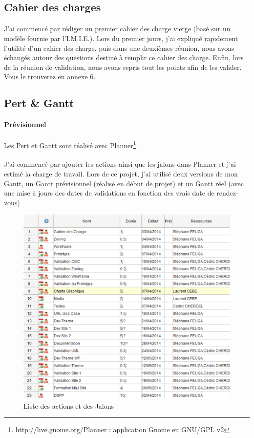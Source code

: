 \documentclass[11pt,a4paper]{report}
\begin{document}
		\subsection{Cahier des charges}
			\paragraph*{}J'ai commencé par rédiger un premier cahier des charge vierge (basé sur un modèle fournie par l'I.M.I.E.). Lors du premier jours, j'ai expliqué rapidement l'utilité d'un cahier des charge, puis dans une deuxièmes réunion, nous avons échangés autour des questions destiné à remplir ce cahier des charge. Enfin, lors de la réunion de validation, nous avons repris tout les points afin de les valider. Vous le trouverez en annexe 6.
		\subsection{Pert \& Gantt}
			\paragraph*{Prévisionnel}Les Pert et Gantt sont réalisé avec Planner\footnote{http://live.gnome.org/Planner : application Gnome en GNU/GPL v2}.
			\paragraph*{}J'ai commencé par ajouter les actions ainsi que les jalons dans Planner et j'ai estimé la charge de travail. Lors de ce projet, j'ai utilisé deux versions de mon Gantt, un Gantt prévisionnel (réalisé en début de projet) et un Gantt réel (avec une mise à jours des dates de validations en fonction des vrais date de rendez-vous)

				\begin{figure}[H]
					\centering
					\includegraphics[height=10cm]{Gantt_Previsionnel_1.eps}
					\caption{Liste des actions et des Jalons}
					\label{fig:List des Actions Gantt Previsionnel}
				\end{figure}\newpage
\end{document}
